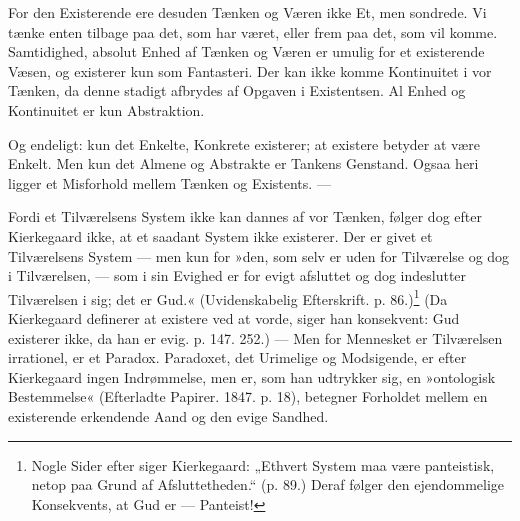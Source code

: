 \documentclass[12pt,a4paper,openany]{book}
\newcommand{\opage}[1]{\marginnote{\footnotesize\textit{[#1]}}}
\begin{document}
For den Existerende ere desuden Tænken og Væren
ikke Et, men sondrede. Vi tænke enten tilbage paa det,
som har været, eller frem paa det, som vil komme. Samtidighed,
absolut Enhed af Tænken og Væren er umulig
for et existerende Væsen, og existerer kun som Fantasteri.
Der kan ikke komme Kontinuitet i vor Tænken,
da denne stadigt afbrydes af Opgaven i Existentsen. Al
Enhed og Kontinuitet er kun Abstraktion.

Og endeligt: kun det Enkelte, Konkrete existerer;
at existere betyder at være Enkelt. Men kun det Almene
og Abstrakte er Tankens Genstand. Ogsaa heri ligger
et Misforhold mellem Tænken og Existents. ---

Fordi et Tilværelsens System ikke kan dannes af
vor Tænken, følger dog efter Kierkegaard ikke, at et
saadant System ikke existerer. Der er givet et Tilværelsens
System --- men kun for »den, som selv er uden
for Tilværelse og dog i Tilværelsen, --- som i sin Evighed
er for evigt afsluttet og dog indeslutter Tilværelsen
i sig; det er Gud.« (Uvidenskabelig Efterskrift.
\opage{64}p. 86.)\footnote{Nogle Sider efter siger Kierkegaard: „Ethvert System maa være panteistisk, netop paa Grund af Afsluttetheden.“ (p. 89.) Deraf følger den ejendommelige Konsekvents, at Gud er --- Panteist!} (Da Kierkegaard definerer at existere ved at
vorde, siger han konsekvent: Gud existerer ikke, da han
er evig. p. 147. 252.) --- Men for Mennesket er Tilværelsen
irrationel, er et Paradox. Paradoxet, det Urimelige
og Modsigende, er efter Kierkegaard ingen Indrømmelse,
men er, som han udtrykker sig, en »ontologisk
Bestemmelse« (Efterladte Papirer. 1847. p. 18), betegner
Forholdet mellem en existerende erkendende Aand og
den evige Sandhed.
\end{document}
